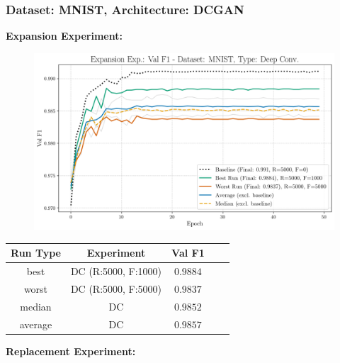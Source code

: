 \subsubsection{Dataset: MNIST, Architecture: DCGAN}\label{app_STRAT_CLASS_PERF_mnist_DCGAN}
\noindent\textbf{Expansion Experiment:}
\begin{figure}[htbp]
	\centering
	\includegraphics[width=.85\textwidth]{abb/strat_classifier_performance/MNIST_STRATIFIED_CLASSIFIERS_VANILLA_GAN/expansion_experiments/val_f1_score_['VANILLA']_MNIST_all.png}
	\label{fig:app_strat_class_performance_expansion_exp_val_f1_score_DCGAN}
\end{figure}
\begin{table}[H]
	\centering
	\vspace{-1em}
	\begin{tabular}{|c|c|c|c|c|}
		\hline
		Run Type & Experiment & Val F1 \\ \hline
		best & DC (R:5000, F:1000) & $0.9884$\\ \hline
		worst & DC (R:5000, F:5000) & $0.9837$\\ \hline
		median & DC & $0.9852$\\ \hline
		average & DC & $0.9857$
		\\ \hline
	\end{tabular}
\end{table}
\noindent\textbf{Replacement Experiment:}
